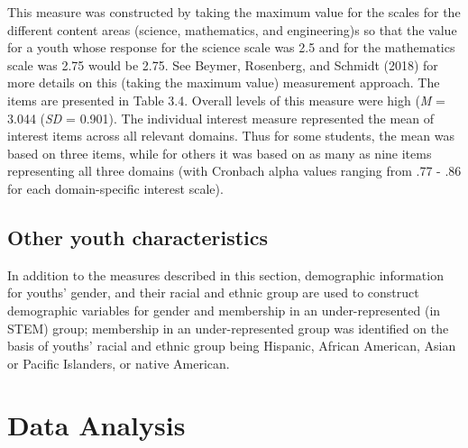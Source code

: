 \documentclass[]{msu-thesis}
\theoremstyle{definition}
\theoremstyle{definition}
\theoremstyle{definition}
\theoremstyle{remark}
\begin{document}
This measure was constructed by taking the maximum value for the scales
for the different content areas (science, mathematics, and engineering)s
so that the value for a youth whose response for the science scale was
2.5 and for the mathematics scale was 2.75 would be 2.75. See Beymer,
Rosenberg, and Schmidt (2018) for more details on this (taking the
maximum value) measurement approach. The items are presented in Table
3.4. Overall levels of this measure were high (\emph{M} = 3.044
(\emph{SD} = 0.901). The individual interest measure represented the
mean of interest items across all relevant domains. Thus for some
students, the mean was based on three items, while for others it was
based on as many as nine items representing all three domains (with
Cronbach alpha values ranging from .77 - .86 for each domain-specific
interest scale).

\begin{table}

\caption{\label{tab:unnamed-chunk-5}Measure for pre-program interest in STEM}
\centering
{}
\end{table}

\subsection{Other youth
characteristics}\label{other-youth-characteristics}

In addition to the measures described in this section, demographic
information for youths' gender, and their racial and ethnic group are
used to construct demographic variables for gender and membership in an
under-represented (in STEM) group; membership in an under-represented
group was identified on the basis of youths' racial and ethnic group
being Hispanic, African American, Asian or Pacific Islanders, or native
American.

\section{Data Analysis}\label{data-analysis}
\end{document}
